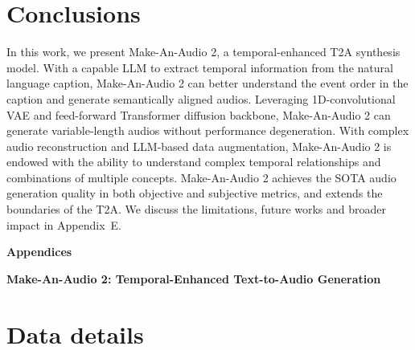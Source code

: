 \documentclass{article}
\begin{document}
  \section{Conclusions}
In this work, we present Make-An-Audio 2, a temporal-enhanced T2A synthesis model. With a capable LLM to extract temporal information from the natural language caption, Make-An-Audio 2 can better understand the event order in the caption and generate semantically aligned audios. Leveraging 1D-convolutional VAE and feed-forward Transformer diffusion backbone, Make-An-Audio 2 can generate variable-length audios without performance degeneration. With complex audio reconstruction and LLM-based data augmentation, Make-An-Audio 2 is endowed with the ability to understand complex temporal relationships and combinations of multiple concepts. Make-An-Audio 2 achieves the SOTA audio generation quality in both objective and subjective metrics, and extends the boundaries of the T2A. We discuss the limitations, future works and broader impact in Appendix~E. 

\newpage



\newpage
\appendix
\onecolumn

\begin{center}{\bf {\LARGE Appendices} }
\end{center}
\begin{center}{\bf {\Large Make-An-Audio 2: Temporal-Enhanced Text-to-Audio Generation} \linebreak}
\end{center}
\section{Data details}  \label{app:data}
\end{document}
